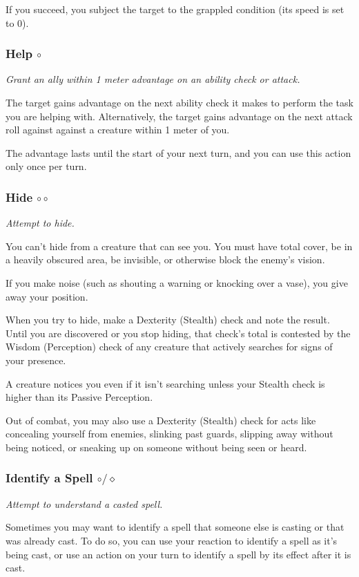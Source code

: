     If you succeed, you subject the target to the grappled condition (its speed is set to 0).
\subsubsection{Help $\circ$} \label{act::help}
    \textit{Grant an ally within 1 meter advantage on an ability check or attack.}

    The target gains advantage on the next ability check it makes to perform the task you are helping with.
    Alternatively, the target gains advantage on the next attack roll against against a creature within 1 meter of you.

    The advantage lasts until the start of your next turn, and you can use this action only once per turn.
\subsubsection{Hide $\circ\circ$} \label{act::hide}
    \textit{Attempt to hide.}

    You can't hide from a creature that can see you.
    You must have total cover, be in a heavily obscured area, be invisible, or otherwise block the enemy's vision.

    If you make noise (such as shouting a warning or knocking over a vase), you give away your position.

    When you try to hide, make a Dexterity (Stealth) check and note the result.
    Until you are discovered or you stop hiding, that check's total is contested by the Wisdom (Perception) check of any creature that actively searches for signs of your presence.

    A creature notices you even if it isn't searching unless your Stealth check is higher than its Passive Perception.

    Out of combat, you may also use a Dexterity (Stealth) check for acts like concealing yourself from enemies, slinking past guards, slipping away without being noticed, or sneaking up on someone without being seen or heard.
\subsubsection{Identify a Spell $\circ/\diamond$} \label{act::identifyaspell}
    \textit{Attempt to understand a casted spell.}

    Sometimes you may want to identify a spell that someone else is casting or that was already cast.
    To do so, you can use your reaction to identify a spell as it's being cast, or use an action on your turn to identify a spell by its effect after it is cast.

